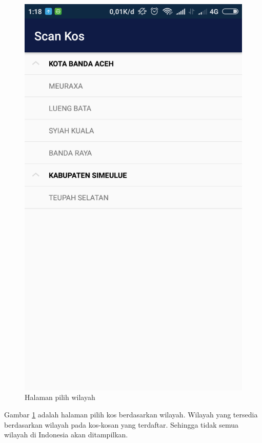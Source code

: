 		\begin{figure}[H]
			\centering
			\includegraphics[scale=0.25]{gambar/and/4}
			\caption{Halaman pilih wilayah}
			\label{and3}
		\end{figure}
	
		Gambar \ref{and3} adalah halaman pilih kos berdasarkan wilayah. Wilayah yang tersedia berdasarkan wilayah pada kos-kosan yang terdaftar. Sehingga tidak semua wilayah di Indonesia akan ditampilkan.
		
